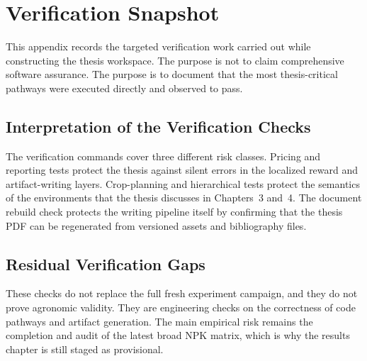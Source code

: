 \chapter{Verification Snapshot}

This appendix records the targeted verification work carried out while constructing the thesis workspace. The purpose is not to claim comprehensive software assurance. The purpose is to document that the most thesis-critical pathways were executed directly and observed to pass.



\section{Interpretation of the Verification Checks}

The verification commands cover three different risk classes. Pricing and reporting tests protect the thesis against silent errors in the localized reward and artifact-writing layers. Crop-planning and hierarchical tests protect the semantics of the environments that the thesis discusses in Chapters~3 and~4. The document rebuild check protects the writing pipeline itself by confirming that the thesis PDF can be regenerated from versioned assets and bibliography files.

\section{Residual Verification Gaps}

These checks do not replace the full fresh experiment campaign, and they do not prove agronomic validity. They are engineering checks on the correctness of code pathways and artifact generation. The main empirical risk remains the completion and audit of the latest broad NPK matrix, which is why the results chapter is still staged as provisional.
